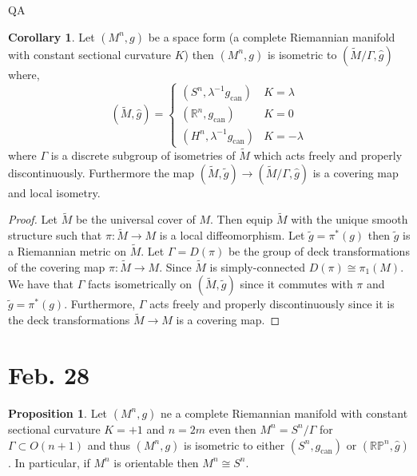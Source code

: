 QA	 \documentclass[12pt]{extarticle}
\newcommand{\R}{\mathbb{R}}
\theoremstyle{definition}
\newtheorem{proposition}[theorem]{Proposition}
\newtheorem{corollary}[theorem]{Corollary}
\begin{document}
\begin{corollary}
Let $(M^n, g)$ be a space form (a complete Riemannian manifold with constant sectional curvature $K$) then $(M^n, g)$ is isometric to $(\tilde{M} / \Gamma, \hat{g})$ where,
\[ (\tilde{M}, \hat{g}) 
= \begin{cases}
(S^n, \lambda^{-1} g_{\text{can}}) & K = \lambda
\\
(\R^n, g_{\text{can}}) & K = 0
\\
(H^n, \lambda^{-1} g_{\text{can}}) & K = - \lambda
\end{cases} \]
where $\Gamma$ is a discrete subgroup of isometries of $\tilde{M}$ which acts freely and properly discontinuously. Furthermore the map $(\tilde{M}, \tilde{g}) \to (\tilde{M} / \Gamma, \hat{g})$ is a covering map and local isometry. 
\end{corollary}

\begin{proof}
Let $\tilde{M}$ be the universal cover of $M$. Then equip $\tilde{M}$ with the unique smooth structure such that $\pi : \tilde{M} \to M$ is a local diffeomorphism. Let $\tilde{g} = \pi^*(g)$ then $\tilde{g}$ is a Riemannian metric on $\tilde{M}$. Let $\Gamma = D(\pi)$ be the group of deck transformations of the covering map $\pi : \tilde{M} \to M$. Since $\tilde{M}$ is simply-connected $D(\pi) \cong \pi_1(M)$. We have that $\Gamma$ facts isometrically on $(\tilde{M}, \tilde{g})$ since it commutes with $\pi$ and $\tilde{g} = \pi^*(g)$. Furthermore, $\Gamma$ acts freely and properly discontinuously since it is the deck transformations $\tilde{M} \to M$ is a covering map.  
\end{proof}

\section{Feb. 28}

\newcommand{\RP}{\mathbb{RP}}

\begin{proposition}
Let $(M^n, g)$ ne a complete Riemannian manifold with constant sectional curvature $K = +1$ and $n = 2m$ even then $M^n = S^n / \Gamma$ for $\Gamma \subset O(n+1)$ and thus $(M^n, g)$ is isometric to either $(S^n, g_{\text{can}})$ or $(\RP^n, \hat{g})$. In particular, if $M^n$ is orientable then $M^n \cong S^n$. 
\end{proposition}
\end{document}
